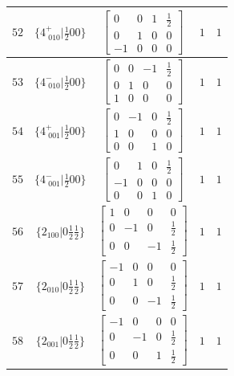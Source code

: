 \documentclass[fleqn,8pt]{jsarticle}
\begin{document}
\begin{longtable}{ccccc}
$ 52 $ & $ \{4^{+}_{\,\,010}|\frac{1}{2} 0 0\} $ & $ \begin{bmatrix} 0 & 0 & 1 & \frac{1}{2} \\ 0 & 1 & 0 & 0 \\ -1 & 0 & 0 & 0 \end{bmatrix} $ & $ 1 $ & $ 1 $ \\ \hline
$ 53 $ & $ \{4^{-}_{\,\,010}|\frac{1}{2} 0 0\} $ & $ \begin{bmatrix} 0 & 0 & -1 & \frac{1}{2} \\ 0 & 1 & 0 & 0 \\ 1 & 0 & 0 & 0 \end{bmatrix} $ & $ 1 $ & $ 1 $ \\ \hline
$ 54 $ & $ \{4^{+}_{\,\,001}|\frac{1}{2} 0 0\} $ & $ \begin{bmatrix} 0 & -1 & 0 & \frac{1}{2} \\ 1 & 0 & 0 & 0 \\ 0 & 0 & 1 & 0 \end{bmatrix} $ & $ 1 $ & $ 1 $ \\ \hline
$ 55 $ & $ \{4^{-}_{\,\,001}|\frac{1}{2} 0 0\} $ & $ \begin{bmatrix} 0 & 1 & 0 & \frac{1}{2} \\ -1 & 0 & 0 & 0 \\ 0 & 0 & 1 & 0 \end{bmatrix} $ & $ 1 $ & $ 1 $ \\ \hline
$ 56 $ & $ \{2{}_{100}|0 \frac{1}{2} \frac{1}{2}\} $ & $ \begin{bmatrix} 1 & 0 & 0 & 0 \\ 0 & -1 & 0 & \frac{1}{2} \\ 0 & 0 & -1 & \frac{1}{2} \end{bmatrix} $ & $ 1 $ & $ 1 $ \\ \hline
$ 57 $ & $ \{2{}_{010}|0 \frac{1}{2} \frac{1}{2}\} $ & $ \begin{bmatrix} -1 & 0 & 0 & 0 \\ 0 & 1 & 0 & \frac{1}{2} \\ 0 & 0 & -1 & \frac{1}{2} \end{bmatrix} $ & $ 1 $ & $ 1 $ \\ \hline
$ 58 $ & $ \{2{}_{001}|0 \frac{1}{2} \frac{1}{2}\} $ & $ \begin{bmatrix} -1 & 0 & 0 & 0 \\ 0 & -1 & 0 & \frac{1}{2} \\ 0 & 0 & 1 & \frac{1}{2} \end{bmatrix} $ & $ 1 $ & $ 1 $ \\ \hline

\end{longtable}
\end{document}
